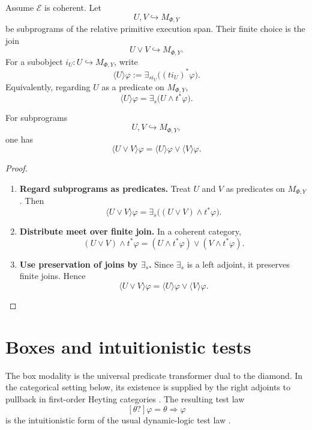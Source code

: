 Assume \(\mathcal E\) is coherent. Let
\[
U,V\hookrightarrow M_{\Phi,Y}
\]
be subprograms of the relative primitive execution span. Their finite choice
is the join
\[
U\vee V\hookrightarrow M_{\Phi,Y}.
\]
For a subobject \(i_U:U\hookrightarrow M_{\Phi,Y}\), write
\[
\langle U\rangle\varphi
:=
\exists_{s i_U}\bigl((t i_U)^\ast\varphi\bigr).
\]
Equivalently, regarding \(U\) as a predicate on \(M_{\Phi,Y}\),
\[
\langle U\rangle\varphi
=
\exists_s\bigl(U\wedge t^\ast\varphi\bigr).
\]

\begin{proposition}
\label{prop:relative-finite-choice-law}
For subprograms
\[
U,V\hookrightarrow M_{\Phi,Y},
\]
one has
\[
\langle U\vee V\rangle\varphi
=
\langle U\rangle\varphi
\vee
\langle V\rangle\varphi.
\]
\end{proposition}

\begin{proof}
\leavevmode
\begin{enumerate}
\item \textbf{Regard subprograms as predicates.}
Treat \(U\) and \(V\) as predicates on \(M_{\Phi,Y}\). Then
\[
\langle U\vee V\rangle\varphi
=
\exists_s\bigl((U\vee V)\wedge t^\ast\varphi\bigr).
\]

\item \textbf{Distribute meet over finite join.}
In a coherent category,
\[
(U\vee V)\wedge t^\ast\varphi
=
(U\wedge t^\ast\varphi)
\vee
(V\wedge t^\ast\varphi).
\]

\item \textbf{Use preservation of joins by \(\exists_s\).}
Since \(\exists_s\) is a left adjoint, it preserves finite joins. Hence
\[
\langle U\vee V\rangle\varphi
=
\langle U\rangle\varphi
\vee
\langle V\rangle\varphi.
\]
\end{enumerate}
\end{proof}

\section{Boxes and intuitionistic tests}
\label{sec:relative-boxes}

The box modality is the universal predicate transformer dual to the diamond.
In the categorical setting below, its existence is supplied by the right
adjoints to pullback in first-order Heyting categories
\cite{Jacobs1999CategoricalLogic}. The resulting test law
\[
[\theta?]\varphi=\theta\Rightarrow\varphi
\]
is the intuitionistic form of the usual dynamic-logic test law
\cite{HarelKozenTiurynDynamicLogic}.

